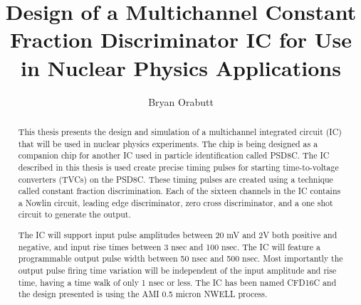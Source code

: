 \documentclass[12pt,oneside,final]{siuethesis}
\author{Bryan Orabutt}
\title{Design of a Multichannel Constant Fraction Discriminator IC for Use in Nuclear Physics Applications}
\theoremstyle{definition}
\begin{document}
\maketitle 

\frontmatter %

\copyrightpage %

\begin{abstract}
\par This thesis presents the design and simulation of a multichannel integrated circuit (IC) that will be used in nuclear physics experiments. The chip is being designed as a companion chip for another IC used in particle identification called PSD8C. The IC described in this thesis is used create precise timing pulses for starting time-to-voltage converters (TVCs) on the PSD8C. These timing pulses are created using a technique called constant fraction discrimination. Each of the sixteen channels in the IC contains a Nowlin circuit, leading edge discriminator, zero cross discriminator, and a one shot circuit to generate the output. \par The IC will support input pulse amplitudes between 20 mV and 2V both positive and negative, and input rise times between 3 nsec and 100 nsec. The IC will feature a programmable output pulse width between 50 nsec and 500 nsec. Most importantly the output pulse firing time variation will be independent of the input amplitude and rise time, having a time walk of only 1 nsec or less. The IC has been named CFD16C and the design presented is using the AMI 0.5 micron NWELL process.

\end{abstract}
\end{document}
